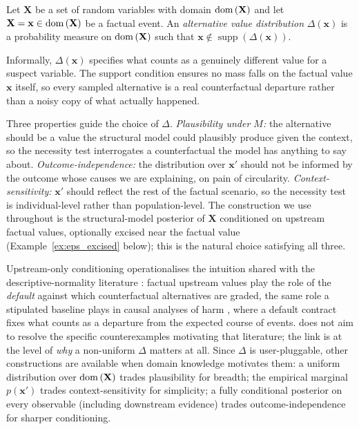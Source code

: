 \begin{definition}\label{def:alt_value_dist}
Let $\mathbf{X}$ be a set of random variables with domain $\operatorname{dom}\,(\mathbf{X})$ and
let $\mathbf{X}=\mathbf{x}\in\operatorname{dom}\,(\mathbf{X})$ be a factual event.
An \emph{alternative value distribution} $\Delta(\mathbf{x})$ is a probability
measure on $\operatorname{dom}\,(\mathbf{X})$ such that $\mathbf{x} \notin \operatorname{supp}(\Delta(\mathbf{x}))$.
\end{definition}

\medskip\noindent Informally, $\Delta(\mathbf{x})$ specifies what counts as a
genuinely different value for a suspect variable. The support condition ensures no mass
falls on the factual value $\mathbf{x}$ itself, so every sampled alternative is a real
counterfactual departure rather than a noisy copy of what actually happened.

\medskip\noindent Three properties guide the choice of $\Delta$.
\emph{Plausibility under $M$:} the alternative should be a value the structural model
could plausibly produce given the context, so the necessity test interrogates a
counterfactual the model has anything to say about.
\emph{Outcome-independence:} the distribution over $\mathbf{x}'$ should not be informed
by the outcome whose causes we are explaining, on pain of circularity.
\emph{Context-sensitivity:} $\mathbf{x}'$ should reflect the rest of the factual
scenario, so the necessity test is individual-level rather than population-level.
The construction we use throughout is the structural-model posterior of $\mathbf{X}$
conditioned on upstream factual values, optionally excised near the factual value
(Example~\ref{ex:eps_excised} below); this is the natural choice satisfying all three.

\medskip\noindent Upstream-only conditioning operationalises the intuition shared with
the descriptive-normality literature \citep{Halpern2015-HALGCA,
icardNormalityActualCausal2017, hitchcock2009cause}: factual upstream values play the role of the
\emph{default} against which counterfactual alternatives are graded, the same role a
stipulated baseline plays in causal analyses of harm \citep{beckersHarm2022}, where a
default contract fixes what counts as a departure from the expected course of events.
\ourapproach does not aim to resolve the specific counterexamples motivating that
literature; the link is at the level of \emph{why} a non-uniform $\Delta$ matters at
all.
Since $\Delta$ is user-pluggable, other constructions are available when domain
knowledge motivates them: a uniform distribution over $\operatorname{dom}\,(\mathbf{X})$ trades
plausibility for breadth; the empirical marginal $p(\mathbf{x}')$ trades
context-sensitivity for simplicity; a fully conditional posterior on every observable
(including downstream evidence) trades outcome-independence for sharper conditioning.


